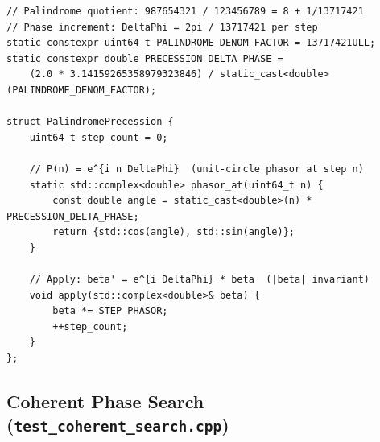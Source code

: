 \documentclass[12pt,a4paper]{article}
\theoremstyle{plain}
\theoremstyle{definition}
\theoremstyle{remark}
\begin{document}
\begin{lstlisting}[caption={PalindromePrecession: unit-circle invariant angular sweep.},
                   label={lst:precession}]
// Palindrome quotient: 987654321 / 123456789 = 8 + 1/13717421
// Phase increment: DeltaPhi = 2pi / 13717421 per step
static constexpr uint64_t PALINDROME_DENOM_FACTOR = 13717421ULL;
static constexpr double PRECESSION_DELTA_PHASE =
    (2.0 * 3.14159265358979323846) / static_cast<double>(PALINDROME_DENOM_FACTOR);

struct PalindromePrecession {
    uint64_t step_count = 0;

    // P(n) = e^{i n DeltaPhi}  (unit-circle phasor at step n)
    static std::complex<double> phasor_at(uint64_t n) {
        const double angle = static_cast<double>(n) * PRECESSION_DELTA_PHASE;
        return {std::cos(angle), std::sin(angle)};
    }

    // Apply: beta' = e^{i DeltaPhi} * beta  (|beta| invariant)
    void apply(std::complex<double>& beta) {
        beta *= STEP_PHASOR;
        ++step_count;
    }
};
\end{lstlisting}

\subsection{Coherent Phase Search (\texttt{test\_coherent\_search.cpp})}
\label{app:search}
\end{document}
